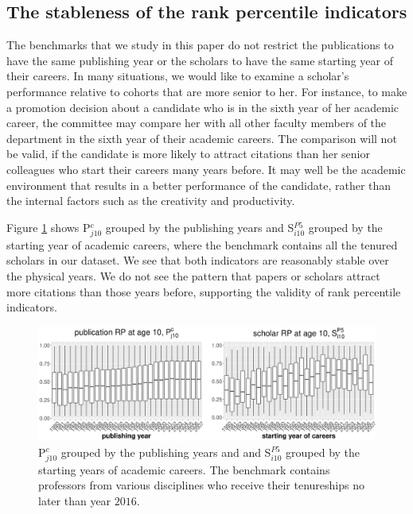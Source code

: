 \subsection*{The stableness of the rank percentile indicators}
The benchmarks that we study in this paper do not restrict the publications to have the same publishing year or the scholars to have the same starting year of their careers. In many situations, we would like to examine a scholar's performance relative to cohorts that are more senior to her. For instance, to make a promotion decision about a candidate who is in the sixth year of her academic career, the committee may compare her with all other faculty members of the department in the sixth year of their academic careers. The comparison will not be valid, if the candidate is more likely to attract citations than her senior colleagues who start their careers many years before. It may well be the academic environment that results in a better performance of the candidate, rather than the internal factors such as the creativity and productivity. 

Figure \ref{fig:stableness_rp} shows P$_{j 10}^c$ grouped by the publishing years and S$_{i 10}^{P5}$ grouped by the starting year of academic careers, where the benchmark contains all the tenured scholars in our dataset. We see that both indicators are reasonably stable over the physical years. We do not see the pattern that papers or scholars attract more citations than those years before, supporting the validity of rank percentile indicators.

\begin{figure}[ht!]
    \centering
    \includegraphics[width=\textwidth]{figures/exploratory/stationarity.eps}
    \caption{P$_{j10}^c$ grouped by the publishing years and and S$_{i10}^{P5}$ grouped by the starting years of academic careers. The benchmark contains professors from various disciplines who receive their tenureships no later than year $2016$.}
    \label{fig:stableness_rp}
\end{figure}

